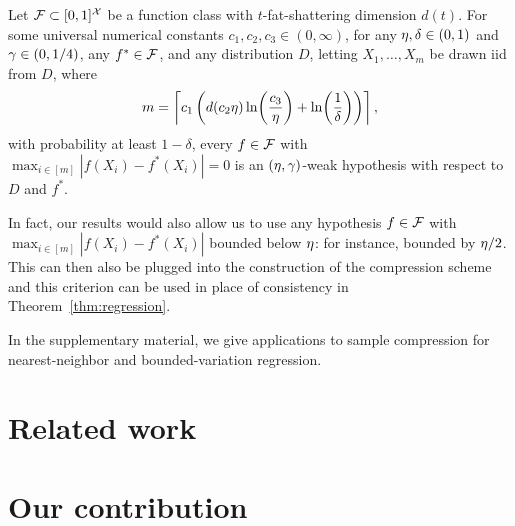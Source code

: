 \begin{theorem}
  \label{thm:gen-weak-learn}
  Let $\mathcal{F}\subset[0,1]^{\mathcal{X}}$ be a
  function class
  with $t$-fat-shattering dimension $d(t)$.
For some universal numerical constants $c_{1},c_{2},c_{3} \in (0,\infty)$, 
for any $\eta,\delta \in (0,1)$ and $\gamma \in (0,1/4)$,
any $f^*\in\mathcal{F}$,
and any distribution $D$,
letting $X_{1},\ldots,X_{m}$ be drawn iid from $D$, where 
\begin{equation*}
  m = \left\lceil c_{1} \left(  d(c_{2} \eta ) \ln\!\left( \frac{c_{3}}{\eta} \right) + \ln\!\left(\frac{1}{\delta}\right) \right) \right\rceil,
\end{equation*}
with probability at least $1-\delta$, every $f \in \mathcal{F}$ with
$
\max_{i\in[m]}
|f(X_{i}) - f^{*}(X_{i})| = 0$
is an $(\eta,\gamma)$-weak hypothesis
with respect to $D$ and $f^*$.
\end{theorem}

In fact, our results would also allow us to use any hypothesis $f \in \mathcal{F}$ with 
$\max_{i \in [m]} |f(X_{i}) - f^{*}(X_{i})|$ bounded below $\eta$: for instance, 
bounded by $\eta / 2$.  This can then also be plugged into the construction of the 
compression scheme and this criterion can be used in place of consistency in Theorem~\ref{thm:regression}.


In the
supplementary material,
we give applications to sample compression
for nearest-neighbor
and
bounded-variation regression.


    


\section{Related work}

\blindmathpaper

    


\section{Our contribution}

\blindmathpaper






